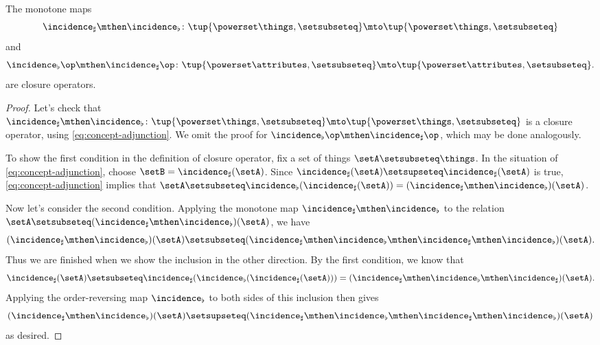 \begin{lemma}\label{lem:cfa-closure-operators}
    The monotone maps
    \begin{equation}
        \incidence_\sharp \mthen \incidence_\flat \colon \tup{\powerset \things, \setsubseteq} \mto \tup{\powerset \things, \setsubseteq}
    \end{equation}
    and
    \begin{equation}
        \incidence_\flat\op \mthen \incidence_\sharp\op \colon \tup{\powerset \attributes, \setsubseteq} \mto \tup{\powerset \attributes, \setsubseteq}.
    \end{equation}
    are closure operators.
\end{lemma}

\begin{proof}
    Let's check that $\incidence_\sharp \mthen \incidence_\flat \colon \tup{\powerset \things, \setsubseteq} \mto \tup{\powerset \things, \setsubseteq}$ is a closure operator, using \cref{eq:concept-adjunction}.
    We omit the proof for $\incidence_\flat\op \mthen \incidence_\sharp\op$, which may be done analogously.

    To show the first condition in the definition of closure operator, fix a set of things $\setA \setsubseteq \things$.
    In the situation of \cref{eq:concept-adjunction}, choose $\setB = \incidence_\sharp(\setA)$.
    Since $\incidence_\sharp(\setA) \setsupseteq \incidence_\sharp(\setA)$ is true, \cref{eq:concept-adjunction} implies that $\setA \setsubseteq \incidence_\flat(\incidence_\sharp(\setA)) = (\incidence_\sharp \mthen \incidence_\flat)(\setA)$.

    Now let's consider the second condition.
    Applying the monotone map $\incidence_\sharp \mthen \incidence_\flat$ to the relation $\setA \setsubseteq (\incidence_\sharp \mthen \incidence_\flat)(\setA)$, we have
    \begin{equation}
        (\incidence_\sharp \mthen \incidence_\flat)(\setA) \setsubseteq (\incidence_\sharp \mthen \incidence_\flat \mthen \incidence_\sharp \mthen \incidence_\flat)(\setA).
    \end{equation}
    Thus we are finished when we show the inclusion in the other direction.
    By the first condition, we know that
    \begin{equation}
        \incidence_\sharp(\setA) \setsubseteq \incidence_\sharp( \incidence_\flat (\incidence_\sharp(\setA))) = (\incidence_\sharp \mthen \incidence_\flat \mthen \incidence_\sharp)(\setA).
    \end{equation}
    Applying the order-reversing map $\incidence_\flat$ to both sides of this inclusion then gives
    \begin{equation}
        (\incidence_\sharp \mthen \incidence_\flat)(\setA) \setsupseteq (\incidence_\sharp \mthen \incidence_\flat \mthen \incidence_\sharp \mthen \incidence_\flat)(\setA)
    \end{equation}
    as desired.
\end{proof}

